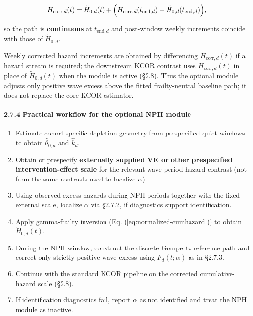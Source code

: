 \documentclass[
]{article}
\providecommand{\tightlist}{%
  \setlength{\itemsep}{0pt}\setlength{\parskip}{0pt}}
\begin{document}
\[
H_{\mathrm{corr},d}(t)=\tilde H_{0,d}(t)+\Bigl(H_{\mathrm{corr},d}(t_{\mathrm{end},d})-\tilde H_{0,d}(t_{\mathrm{end},d})\Bigr),
\]

so the path is \textbf{continuous} at \(t_{\mathrm{end},d}\) and
post-window weekly increments coincide with those of \(\tilde H_{0,d}\).

Weekly corrected hazard increments are obtained by differencing
\(H_{\mathrm{corr},d}(t)\) if a hazard stream is required; the
downstream KCOR contrast uses \(H_{\mathrm{corr},d}(t)\) in place of
\(\tilde H_{0,d}(t)\) when the module is active (§2.8). Thus the
optional module adjusts only positive wave excess above the fitted
frailty-neutral baseline path; it does not replace the core KCOR
estimator.

\paragraph{2.7.4 Practical workflow for the optional NPH
module}\label{practical-workflow-for-the-optional-nph-module}

\begin{enumerate}
\def\labelenumi{\arabic{enumi}.}
\tightlist
\item
  Estimate cohort-specific depletion geometry from prespecified quiet
  windows to obtain \(\hat\theta_{0,d}\) and \(\hat k_d\).
\item
  Obtain or prespecify \textbf{externally supplied VE or other
  prespecified intervention-effect scale} for the relevant wave-period
  hazard contrast (not from the same contrasts used to localize
  \(\alpha\)).
\item
  Using observed excess hazards during NPH periods together with the
  fixed external scale, localize \(\alpha\) via §2.7.2, if diagnostics
  support identification.
\item
  Apply gamma-frailty inversion (Eq. (\ref{eq:normalized-cumhazard})) to
  obtain \(\tilde H_{0,d}(t)\).
\item
  During the NPH window, construct the discrete Gompertz reference path
  and correct only strictly positive wave excess using \(F_d(t;\alpha)\)
  as in §2.7.3.
\item
  Continue with the standard KCOR pipeline on the corrected
  cumulative-hazard scale (§2.8).
\item
  If identification diagnostics fail, report \(\alpha\) as not
  identified and treat the NPH module as inactive.
\end{enumerate}
\end{document}
